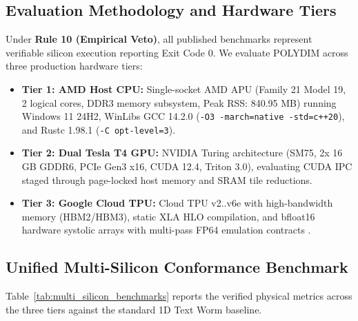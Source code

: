\documentclass[journal,10pt,compsoc]{IEEEtran}
\theoremstyle{plain}
\theoremstyle{definition}
\begin{document}
\subsection{Evaluation Methodology and Hardware Tiers}
Under \textbf{Rule 10 (Empirical Veto)}, all published benchmarks represent verifiable silicon execution reporting Exit Code 0. We evaluate POLYDIM across three production hardware tiers:
\begin{itemize}
    \item \textbf{Tier 1: AMD Host CPU:} Single-socket AMD APU (Family 21 Model 19, 2 logical cores, DDR3 memory subsystem, Peak RSS: 840.95 MB) running Windows 11 24H2, WinLibs GCC 14.2.0 (\texttt{-O3 -march=native -std=c++20}), and Rustc 1.98.1 (\texttt{-C opt-level=3}).
    \item \textbf{Tier 2: Dual Tesla T4 GPU:} NVIDIA Turing architecture (SM75, 2x 16 GB GDDR6, PCIe Gen3 x16, CUDA 12.4, Triton 3.0), evaluating CUDA IPC staged through page-locked host memory and SRAM tile reductions.
    \item \textbf{Tier 3: Google Cloud TPU:} Cloud TPU v2..v6e with high-bandwidth memory (HBM2/HBM3), static XLA HLO compilation, and bfloat16 hardware systolic arrays with multi-pass FP64 emulation contracts \cite{chen2018tvm}.
\end{itemize}

\subsection{Unified Multi-Silicon Conformance Benchmark}
Table~\ref{tab:multi_silicon_benchmarks} reports the verified physical metrics across the three tiers against the standard 1D Text Worm baseline.
\end{document}
